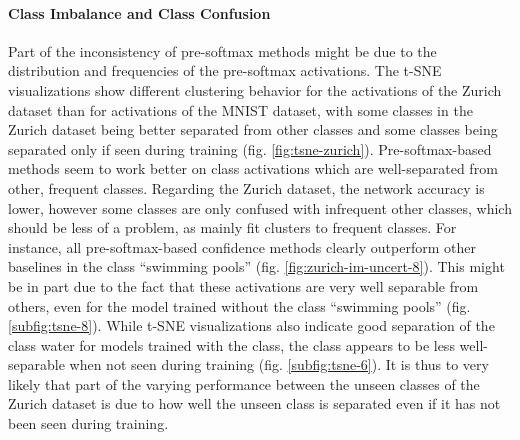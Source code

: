 \documentclass[10pt]{article}
\begin{document}
\paragraph{Class Imbalance and Class Confusion} Part of the inconsistency of pre-softmax methods might be due to the distribution and frequencies of the pre-softmax activations. The \gls{t-SNE} visualizations show different clustering behavior for the activations of the Zurich dataset than for activations of the \gls{MNIST} dataset, with some classes in the Zurich dataset being better separated from other classes and some classes being separated only if seen during training (fig. \ref{fig:tsne-zurich}). Pre-softmax-based methods seem to work better on class activations which are well-separated from other, frequent classes. Regarding the Zurich dataset, the network accuracy is lower, however some classes are only confused with infrequent other classes, which should be less of a problem, as  mainly fit clusters to frequent classes. For instance, all pre-softmax-based confidence methods clearly outperform other baselines in the class ``swimming pools'' (fig. \ref{fig:zurich-im-uncert-8}). This might be in part due to the fact that these activations are very well separable from others, even for the model trained without the class ``swimming pools'' (fig. \ref{subfig:tsne-8}). While \gls{t-SNE} visualizations also indicate good separation of the class water for models trained with the class, the class appears to be less well-separable when not seen during training (fig. \ref{subfig:tsne-6}). It is thus to very likely that part of the varying performance between the unseen classes of the Zurich dataset is due to how well the unseen class is separated even if it has not been seen during training.

\end{document}
